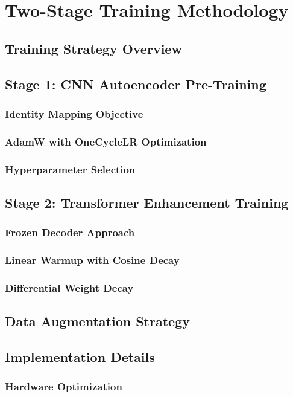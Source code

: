 \documentclass[12pt,a4paper]{report}
\begin{document}
\chapter{Two-Stage Training Methodology}
\section{Training Strategy Overview}
\section{Stage 1: CNN Autoencoder Pre-Training}
\subsection{Identity Mapping Objective}
\subsection{AdamW with OneCycleLR Optimization}
\subsection{Hyperparameter Selection}
\section{Stage 2: Transformer Enhancement Training}
\subsection{Frozen Decoder Approach}
\subsection{Linear Warmup with Cosine Decay}
\subsection{Differential Weight Decay}
\section{Data Augmentation Strategy}
\section{Implementation Details}
\subsection{Hardware Optimization}
\end{document}
